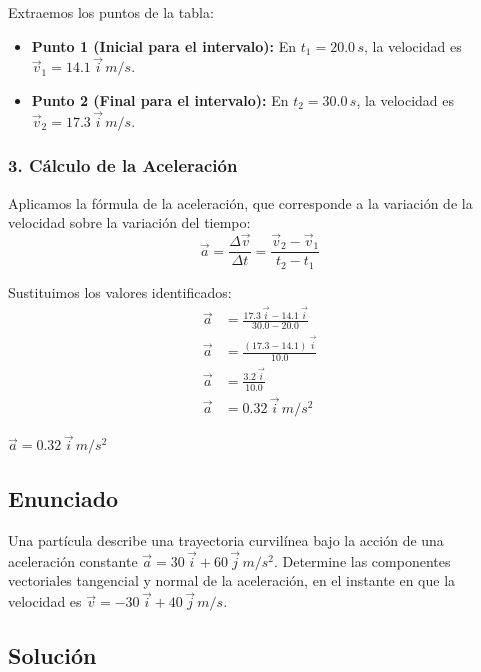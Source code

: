 \documentclass[12pt, a4paper]{article}
\begin{document}
Extraemos los puntos de la tabla:
\begin{itemize}
    \item \textbf{Punto 1 (Inicial para el intervalo):} En $t_1 = 20.0 \, \si{s}$, la velocidad es $\vec{v}_1 = 14.1 \, \vec{i} \, \si{m/s}$.
    \item \textbf{Punto 2 (Final para el intervalo):} En $t_2 = 30.0 \, \si{s}$, la velocidad es $\vec{v}_2 = 17.3 \, \vec{i} \, \si{m/s}$.
\end{itemize}

\subsubsection*{3. Cálculo de la Aceleración}
Aplicamos la fórmula de la aceleración, que corresponde a la variación de la velocidad sobre la variación del tiempo:
$$ \vec{a} = \frac{\Delta \vec{v}}{\Delta t} = \frac{\vec{v}_2 - \vec{v}_1}{t_2 - t_1} $$

Sustituimos los valores identificados:
\begin{align*}
    \vec{a} &= \frac{17.3 \, \vec{i} - 14.1 \, \vec{i}}{30.0 - 20.0} \\
    \vec{a} &= \frac{(17.3 - 14.1) \, \vec{i}}{10.0} \\
    \vec{a} &= \frac{3.2 \, \vec{i}}{10.0} \\
    \vec{a} &= 0.32 \, \vec{i} \, \si{m/s^2}
\end{align*}

\begin{tcolorbox}[colback=green!5!white, colframe=green!50!black, title=Respuesta Final]
\centering \Large $\vec{a} = 0.32 \, \vec{i} \, \si{m/s^2}$
\end{tcolorbox}

\newpage

\subsection*{Enunciado}
Una partícula describe una trayectoria curvilínea bajo la acción de una aceleración constante $\vec{a} = 30 \, \vec{i} + 60 \, \vec{j} \, \si{m/s^2}$. Determine las componentes vectoriales tangencial y normal de la aceleración, en el instante en que la velocidad es $\vec{v} = -30 \, \vec{i} + 40 \, \vec{j} \, \si{m/s}$.

\subsection*{Solución}
\end{document}
